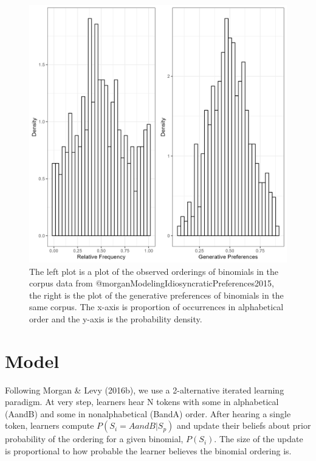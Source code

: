 \documentclass[10pt, letterpaper]{article}
\newenvironment{CodeChunk}{}{}
\begin{document}
\begin{CodeChunk}
\begin{figure}[tb]

{\centering \includegraphics[width=1\linewidth]{Figures/corpus_plots} 

}

\caption[The left plot is a plot of the observed orderings of binomials in the corpus data from @morganModelingIdiosyncraticPreferences2015, the right is the plot of the generative preferences of binomials in the same corpus]{The left plot is a plot of the observed orderings of binomials in the corpus data from @morganModelingIdiosyncraticPreferences2015, the right is the plot of the generative preferences of binomials in the same corpus. The x-axis is proportion of occurrences in alphabetical order and the y-axis is the probability density.}\label{fig:corpusplot1}
\end{figure}
\end{CodeChunk}

\hypertarget{model}{%
\section{Model}\label{model}}

Following Morgan \& Levy (2016b), we use a 2-alternative iterated
learning paradigm. At very step, learners hear N tokens with some in
alphabetical (AandB) and some in nonalphabetical (BandA) order. After
hearing a single token, learners compute \(P(S_i = AandB|S_p)\) and
update their beliefs about prior probability of the ordering for a given
binomial, \(P(S_i)\). The size of the update is proportional to how
probable the learner believes the binomial ordering is.
\end{document}
